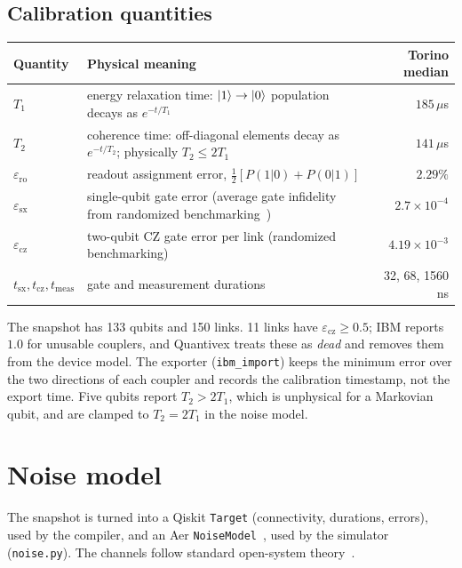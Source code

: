 \documentclass[10pt,a4paper]{article}
\newcommand{\code}[1]{\texttt{\small #1}}
\begin{document}
\subsection{Calibration quantities}
\begin{center}\small
\begin{tabularx}{\linewidth}{@{}lXr@{}}\toprule
Quantity & Physical meaning & Torino median\\\midrule
$T_1$ & energy relaxation time: $\ket1\to\ket0$ population decays as $e^{-t/T_1}$ & $185\,\mu$s\\
$T_2$ & coherence time: off-diagonal elements decay as $e^{-t/T_2}$; physically $T_2\le 2T_1$ & $141\,\mu$s\\
$\varepsilon_{\mathrm{ro}}$ & readout assignment error, $\tfrac12[P(1|0)+P(0|1)]$ & $2.29\%$\\
$\varepsilon_{\mathrm{sx}}$ & single-qubit gate error (average gate infidelity from randomized benchmarking~\cite{Magesan2011}) & $2.7\times10^{-4}$\\
$\varepsilon_{\mathrm{cz}}$ & two-qubit CZ gate error per link (randomized benchmarking) & $4.19\times10^{-3}$\\
$t_{\mathrm{sx}},t_{\mathrm{cz}},t_{\mathrm{meas}}$ & gate and measurement durations & 32, 68, 1560 ns\\\bottomrule
\end{tabularx}
\end{center}
The snapshot has 133 qubits and 150 links. 11 links have $\varepsilon_{\mathrm{cz}}\ge 0.5$; IBM reports $1.0$ for unusable couplers, and Quantivex treats these as \emph{dead} and removes them from the device model. The exporter (\code{ibm\_import}) keeps the minimum error over the two directions of each coupler and records the calibration timestamp, not the export time. Five qubits report $T_2>2T_1$, which is unphysical for a Markovian qubit, and are clamped to $T_2=2T_1$ in the noise model.

\section{Noise model}\label{sec:noise}
The snapshot is turned into a Qiskit \code{Target} (connectivity, durations, errors), used by the compiler, and an Aer \code{NoiseModel}~\cite{Qiskit2024}, used by the simulator (\code{noise.py}). The channels follow standard open-system theory~\cite{NielsenChuang}.
\end{document}
